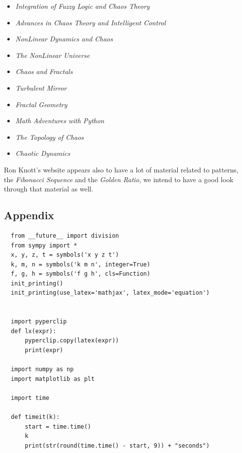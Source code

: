 \documentclass[11pt]{article}
\begin{document}
\begin{itemize}
\item \emph{Integration of Fuzzy Logic and Chaos Theory}      \cite{liIntegrationFuzzyLogic2006}
\item \emph{Advances in Chaos Theory and Intelligent Control} \cite{azarAdvancesChaosTheory2016}
\item \emph{NonLinear Dynamics and Chaos}                     \cite{strogatzNonlinearDynamicsChaos2015}
\item \emph{The NonLinear Universe}                           \cite{scottNonlinearUniverseChaos2007}
\item \emph{Chaos and Fractals}                               \cite{peitgenChaosFractalsNew2004}
\item \emph{Turbulent Mirror}                                 \cite{briggsTurbulentMirrorIllustrated1989}
\item \emph{Fractal Geometry}                                 \cite{falconerFractalGeometryMathematical2003b}
\item \emph{Math Adventures with Python}                      \cite{farrellMathAdventuresPython2019}
\item \emph{The Topology of Chaos}                            \cite{gilmoreTopologyChaosAlice2002}
\item \emph{Chaotic Dynamics}                                 \cite{telChaoticDynamicsIntroduction2006}
\end{itemize}

Ron Knott's website appears also to have a lot of material related to patterns, the \emph{Fibonacci Sequence} and the \emph{Golden Ratio}, we intend to have a good look through that material as well. \cite{ronknottFibonacciNumbersGolden2016}

\subsection{Appendix}
\label{sec:orgcf29373}

\begin{lstlisting}
  from __future__ import division
  from sympy import *
  x, y, z, t = symbols('x y z t')
  k, m, n = symbols('k m n', integer=True)
  f, g, h = symbols('f g h', cls=Function)
  init_printing()
  init_printing(use_latex='mathjax', latex_mode='equation')


  import pyperclip
  def lx(expr):
      pyperclip.copy(latex(expr))
      print(expr)

  import numpy as np
  import matplotlib as plt

  import time

  def timeit(k):
      start = time.time()
      k
      print(str(round(time.time() - start, 9)) + "seconds")
\end{lstlisting}
\end{document}
